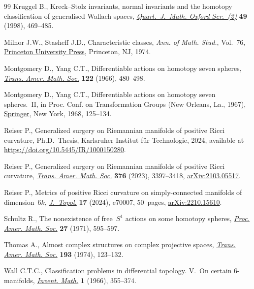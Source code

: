\begin{thebibliography}{99}
Kruggel B., Kreck--{S}tolz invariants, normal invariants and the homotopy
  classification of generalised {W}allach spaces,
  \href{https://doi.org/10.1093/qmathj/49.4.469}{\textit{Quart.~J.~Math. Oxford
  Ser.~(2)}} \textbf{49} (1998), 469--485.

Milnor J.W., Stasheff J.D., Characteristic classes, \textit{Ann. of Math.
  Stud.}, Vol.~76, \href{https://doi.org/10.1515/9781400881826}{Princeton
  University Press}, Princeton, NJ, 1974.

Montgomery D., Yang C.T., Differentiable actions on homotopy seven spheres,
  \href{https://doi.org/10.2307/1994562}{\textit{Trans. Amer. Math. Soc.}}
  \textbf{122} (1966), 480--498.

Montgomery D., Yang C.T., Differentiable actions on homotopy seven
  spheres.~{II}, in Proc. {C}onf. on {T}ransformation {G}roups ({N}ew
  {O}rleans, {L}a., 1967),
  \href{https://doi.org/10.1007/978-3-642-46141-5_4}{Springer}, New York, 1968,
  125--134.

Reiser P., Generalized surgery on {R}iemannian manifolds of positive {R}icci
  curvature, Ph.D.~Thesis, {K}arlsruher Institut f\"ur Technologie, 2024,
  available at \url{https://doi.org/10.5445/IR/1000150280}.

Reiser P., Generalized surgery on {R}iemannian manifolds of positive {R}icci
  curvature, \href{https://doi.org/10.1090/tran/8789}{\textit{Trans. Amer.
  Math. Soc.}} \textbf{376} (2023), 3397--3418,
  \href{https://arxiv.org/abs/2103.05517}{arXiv:2103.05517}.

Reiser P., Metrics of positive {R}icci curvature on simply-connected manifolds
  of dimension~{$6k$},
  \href{https://doi.org/10.1112/topo.70007}{\textit{J.~Topol.}} \textbf{17}
  (2024), e70007, 50~pages,
  \href{https://arxiv.org/abs/2210.15610}{arXiv:2210.15610}.

Schultz R., The nonexistence of free~{$S^{1}$} actions on some homotopy
  spheres, \href{https://doi.org/10.2307/2036505}{\textit{Proc. Amer. Math.
  Soc.}} \textbf{27} (1971), 595--597.

Thomas A., Almost complex structures on complex projective spaces,
  \href{https://doi.org/10.2307/1996904}{\textit{Trans. Amer. Math. Soc.}}
  \textbf{193} (1974), 123--132.

Wall C.T.C., Classification problems in differential topology. {V}.~{O}n
  certain {$6$}-manifolds,
  \href{https://doi.org/10.1007/BF01389738}{\textit{Invent. Math.}} \textbf{1}
  (1966), 355--374.


\end{thebibliography}
